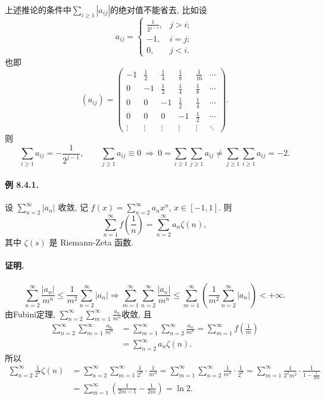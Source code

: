 上述推论的条件中$\sum_{i\ge1}\left|a_{ij}\right|$的绝对值不能省去, 比如设
\[
a_{ij}=\begin{cases}
\frac{1}{2^{j-i}}, & j>i;\\
-1, & i=j;\\
0, & j<i.
\end{cases}
\]
也即
\[
\left(a_{ij}\right)=\begin{pmatrix}-1 & \frac{1}{2} & \frac{1}{4} & \frac{1}{8} & \frac{1}{16} & \cdots\\
0 & -1 & \frac{1}{2} & \frac{1}{4} & \frac{1}{8} & \cdots\\
0 & 0 & -1 & \frac{1}{2} & \frac{1}{4} & \cdots\\
0 & 0 & 0 & -1 & \frac{1}{2} & \cdots\\
\vdots & \vdots & \vdots & \vdots & \vdots & \ddots
\end{pmatrix}.
\]
则
\[
\sum_{i\ge1}a_{ij}=-\frac{1}{2^{j-1}},\qquad\sum_{j\ge1}a_{ij}\equiv0\ \Longrightarrow\ 0=\sum_{i\ge1}\sum_{j\ge1}a_{ij}\ne\sum_{j\ge1}\sum_{i\ge1}a_{ij}=-2.
\]


\paragraph{例 8.4.1. }

设 $\sum_{n=2}^{\infty}\left|a_{n}\right|$ 收敛, 记 $f(x)=\sum_{n=2}^{\infty}a_{n}x^{n}$,
$x\in[-1,1]$. 则 
\[
\sum_{n=1}^{\infty}f\left(\frac{1}{n}\right)=\sum_{n=2}^{\infty}a_{n}\zeta(n),
\]
其中 $\zeta(s)$ 是 Riemann-Zeta 函数.

\paragraph{证明.}

\[
\sum_{n=2}^{\infty}\frac{\left|a_{n}\right|}{m^{n}}\le\frac{1}{m^{2}}\sum_{n=2}^{\infty}\left|a_{n}\right|\Longrightarrow\sum_{m=1}^{\infty}\sum_{n=2}^{\infty}\frac{\left|a_{n}\right|}{m^{n}}\le\sum_{m=1}^{\infty}\left(\frac{1}{m^{2}}\sum_{n=2}^{\infty}\left|a_{n}\right|\right)<+\infty.
\]
由Fubini定理, $\sum_{n=2}^{\infty}\sum_{m=1}^{\infty}\frac{a_{n}}{m^{n}}$收敛,
且
\begin{align*}
\sum_{n=2}^{\infty}\sum_{m=1}^{\infty}\frac{a_{n}}{m^{n}} & =\sum_{m=1}^{\infty}\sum_{n=2}^{\infty}\frac{a_{n}}{m^{n}}=\sum_{m=1}^{\infty}f\left(\frac{1}{m}\right)\\
 & =\sum_{n=2}^{\infty}a_{n}\zeta(n).
\end{align*}
所以
\begin{align*}
\sum_{n=2}^{\infty}\frac{1}{2^{n}}\zeta(n) & =\sum_{n=2}^{\infty}\sum_{m=1}^{\infty}\frac{1}{2^{n}}\cdot\frac{1}{m^{n}}=\sum_{m=1}^{\infty}\sum_{n=2}^{\infty}\frac{1}{m^{n}}\cdot\frac{1}{2^{n}}=\sum_{m=1}^{\infty}\frac{1}{2^{2}m^{2}}\cdot\frac{1}{1-\frac{1}{2m}}\\
 & =\sum_{m=1}^{\infty}\left(\frac{1}{2m-1}-\frac{1}{2m}\right)=\ln2.
\end{align*}


